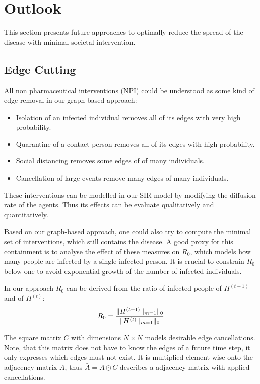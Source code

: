 
\section{Outlook}
This section presents future approaches to optimally reduce the spread of the disease with minimal societal intervention.

\subsection{Edge Cutting}
All non pharmaceutical interventions (NPI) could be understood as some kind of edge removal in our graph-based approach:
\begin{itemize}
	\item Isolation of an infected individual removes all of its edges with very high probability.
	\item Quarantine of a contact person removes all of its edges with high probability.
	\item Social distancing removes some edges of of many individuals.
	\item Cancellation of large events remove many edges of many individuals.
\end{itemize}
These interventions can be modelled in our SIR model by modifying the diffusion rate of the agents.
Thus its effects can be evaluate qualitatively and quantitatively.

Based on our graph-based approach, one could also try to compute the minimal set of interventions, which still contains the disease.
A good proxy for this containment is to analyse the effect of these measures on $R_0$, which models how many people are infected by a single infected person.
It is crucial to constrain $R_0$ below one to avoid exponential growth of the number of infected individuals.

In our approach $R_0$ can be derived from the ratio of infected people of $H^{(t+1)}$ and of $H^{(t)}$:
\begin{equation}
	R_0 = \frac{\norm{H^{(t+1)}\mid_{m=1}}_{0}}{\norm{H^{(t)}\mid_{m=1}}_{0}} %
\end{equation}

The square matrix $C$ with dimensions $N \times N$ models desirable edge cancellations.
Note, that this matrix does not have to know the edges of a future time step, it only expresses which edges must not exist.
It is multiplied element-wise onto the adjacency matrix $A$, thus $\bar{A} = A \odot C$ describes a adjacency matrix with applied cancellations.

